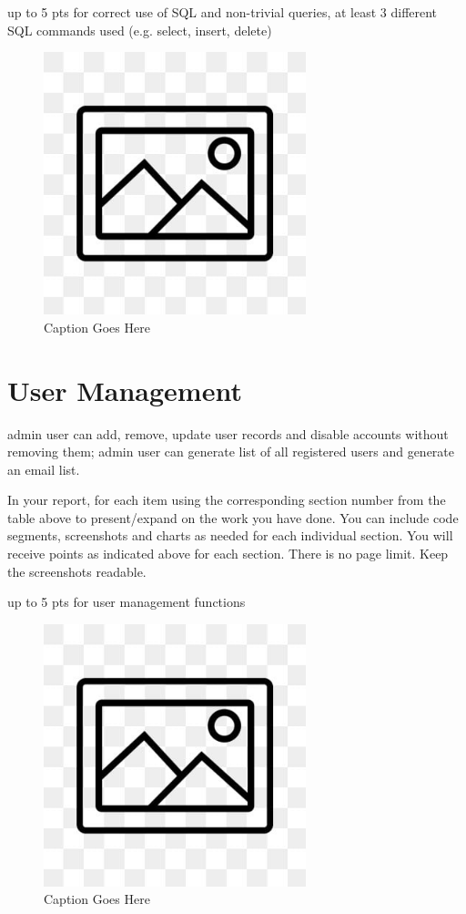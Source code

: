 \documentclass[12pt, letterpaper]{article}
\begin{document}
up to 5 pts for correct use of SQL and non-trivial queries, at least 3 different SQL commands used (e.g. select, insert, delete)

\begin{figure}[htbp]
	\centering
	\includegraphics[width=3in]{images/placeholder.jpg}
	\caption{Caption Goes Here}
 \end{figure}

 \newpage

\section{User Management}
admin user can add, remove, update user records and disable accounts without removing them; admin user can generate list of all registered users and generate an email list.

In your report, for each item using the corresponding section number from the table above to present/expand on the work you have done. You can include code segments, screenshots and charts as needed for each individual section. You will receive points as indicated above for each section. There is no page limit. Keep the screenshots readable.

up to 5 pts for user management functions

\begin{figure}[htbp]
	\centering
	\includegraphics[width=3in]{images/placeholder.jpg}
	\caption{Caption Goes Here}
 \end{figure}
\end{document}
